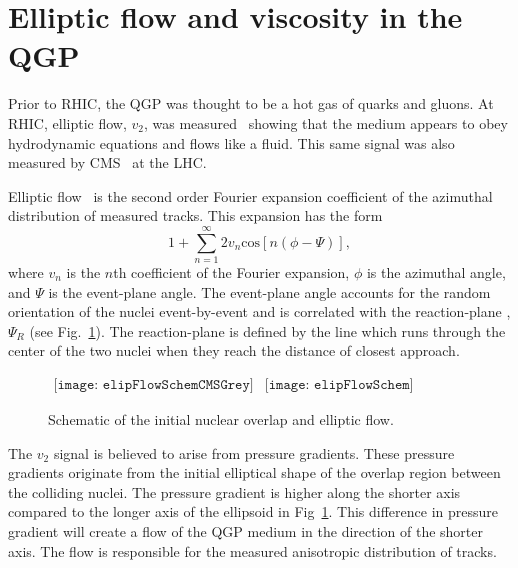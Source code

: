   \section{Elliptic flow and viscosity in the QGP \label{sec:elipFlow}}
    Prior to RHIC, the QGP was thought to be a hot gas of quarks and gluons.
    At RHIC, elliptic flow, $v_{2}$, was measured~\cite{Ackermann:2000tr} showing that the medium 
      appears to obey hydrodynamic equations and flows like a fluid.
    This same signal was also measured by CMS~\cite{cmsFlow} at the LHC. 

    Elliptic flow~\cite{Ollitrault:1992bk,Sorensen:2009cz} is the second order Fourier expansion coefficient  
      of the azimuthal distribution of measured tracks.
    This expansion has the form
    \begin{equation}
      1+\sum^{\infty}_{n=1}2v_{n}\mathrm{cos}\left[n\left(\phi-\Psi\right)\right],
      \label{eg:v2Expand}
    \end{equation}
      where $v_{n}$ is the $n$th coefficient of the Fourier expansion, $\phi$
      is the azimuthal angle, and $\Psi$ is the event-plane angle.
    The event-plane angle accounts for the random orientation of the 
      nuclei event-by-event and is correlated with the reaction-plane
      , $\Psi_{R}$ (see Fig.~\ref{fig:elipSchem}).
    The reaction-plane is defined by the line which runs through the center
      of the two nuclei when they reach the distance of closest approach. 
    \begin{figure}[!Hhbt]
      \centering
      $ \begin{array}{cc}
      \texttt{[image: elipFlowSchemCMSGrey]} &
      \texttt{[image: elipFlowSchem]}
      \end{array} $
      \caption{Schematic of the initial nuclear overlap and elliptic flow.}
      \label{fig:elipSchem}
    \end{figure}

    The $v_{2}$ signal is believed to arise from pressure gradients.
    These pressure gradients originate from the initial elliptical shape of 
      the overlap region between the colliding nuclei. 
    The pressure gradient is higher along the shorter axis compared to 
      the longer axis of the ellipsoid in Fig~\ref{fig:elipSchem}.
    This difference in pressure gradient will create a flow of the QGP 
      medium in the direction of the shorter axis. 
    The flow is responsible for the measured anisotropic distribution of 
      tracks. 

